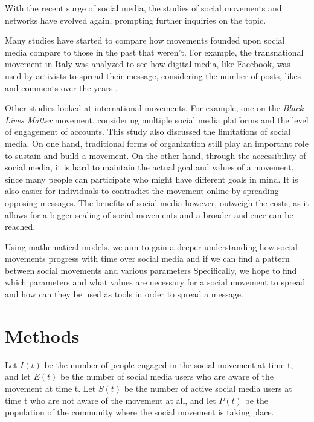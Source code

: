\documentclass{article}
\begin{document}
    With the recent surge of social media, the studies of social movements and networks have evolved again, prompting further inquiries on the topic\cite{kumar_structure_2006}.
    
    Many studies have started to compare how movements founded upon social media compare to those in the past that weren't\cite{kidd_social_2016}. For example, the transnational movement in Italy was analyzed to see how digital media, like Facebook, was used by activists to spread their message, considering the number of posts, likes and comments over the  years \cite{pavan_digital_2019}. 
    
    Other studies looked at international movements. For example, one on the \textit{Black Lives Matter} movement, considering multiple social media platforms and the level of engagement of accounts. This study also discussed the limitations of social media. On one hand, traditional forms of organization still play an important role to sustain and build a movement. On the other hand, through the accessibility of social media, it is hard to maintain the actual goal and values of a movement, since many people can participate who might have different goals in mind. It is also easier for individuals to contradict the movement online by spreading opposing messages. The benefits of social media however, outweigh the costs, as it allows for a bigger scaling of social movements and a broader audience can be reached. \cite{mundt_scaling_2018}

    
    Using mathematical models, we aim to gain a deeper understanding how social movements progress with time over social media and if we can find a pattern between social movements and various parameters Specifically, we hope to find which parameters and what values are necessary for a social movement to spread and how can they be used as tools in order to spread a message.

    \section{Methods}
   
    Let $I(t)$ be the number of people engaged in the social movement at time t, and
    let $E(t)$ be the number of social media users who are aware of the movement at time t. Let $S(t)$ be the number of active social media users at time t who are not aware of the movement at all, and let $P(t)$ be the population of the community where the social movement is taking place. 
    
\end{document}
